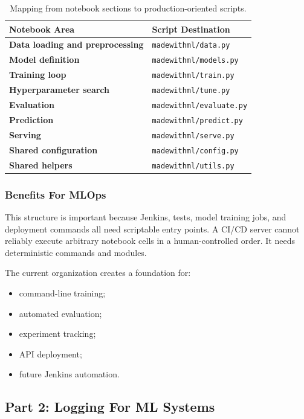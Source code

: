 \documentclass[11pt,a4paper]{article}
\begin{document}
\begin{table}[H]
\centering
\begin{tabularx}{0.96\textwidth}{>{\bfseries}p{} X}
\toprule
Notebook Area & Script Destination \\
\midrule
Data loading and preprocessing & \texttt{madewithml/data.py} \\
Model definition & \texttt{madewithml/models.py} \\
Training loop & \texttt{madewithml/train.py} \\
Hyperparameter search & \texttt{madewithml/tune.py} \\
Evaluation & \texttt{madewithml/evaluate.py} \\
Prediction & \texttt{madewithml/predict.py} \\
Serving & \texttt{madewithml/serve.py} \\
Shared configuration & \texttt{madewithml/config.py} \\
Shared helpers & \texttt{madewithml/utils.py} \\
\bottomrule
\end{tabularx}
\caption{Mapping from notebook sections to production-oriented scripts.}
\end{table}

\subsubsection{Benefits For MLOps}

This structure is important because Jenkins, tests, model training jobs, and deployment commands all need scriptable entry points. A CI/CD server cannot reliably execute arbitrary notebook cells in a human-controlled order. It needs deterministic commands and modules.

The current organization creates a foundation for:

\begin{itemize}
    \item command-line training;
    \item automated evaluation;
    \item experiment tracking;
    \item API deployment;
    \item future Jenkins automation.
\end{itemize}

\subsection{Part 2: Logging For ML Systems}
\end{document}
